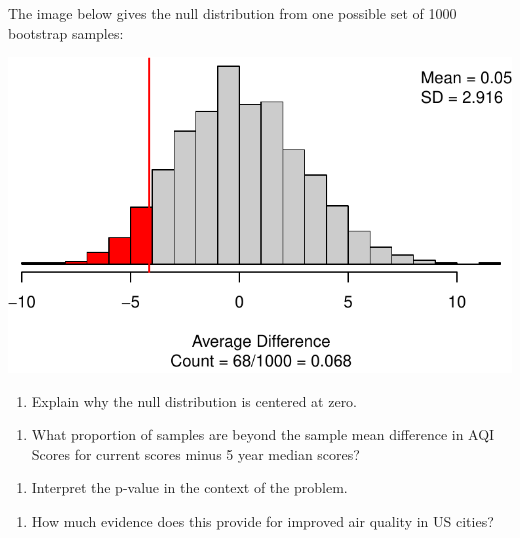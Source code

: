 \documentclass[
]{report}
\providecommand{\tightlist}{%
  \setlength{\itemsep}{0pt}\setlength{\parskip}{0pt}}
\begin{document}
\vspace{1in}

The image below gives the null distribution from one possible set of 1000 bootstrap samples:

\begin{center}\includegraphics[width=0.7\linewidth]{08-paired_files/figure-latex/unnamed-chunk-4-1} \end{center}

\begin{enumerate}
\def\labelenumi{\arabic{enumi}.}
\setcounter{enumi}{11}
\tightlist
\item
  Explain why the null distribution is centered at zero.
\end{enumerate}

\vspace{1in}

\begin{enumerate}
\def\labelenumi{\arabic{enumi}.}
\setcounter{enumi}{12}
\tightlist
\item
  What proportion of samples are beyond the sample mean difference in AQI Scores for current scores minus 5 year median scores?
\end{enumerate}

\vspace{1in}

\begin{enumerate}
\def\labelenumi{\arabic{enumi}.}
\setcounter{enumi}{13}
\tightlist
\item
  Interpret the p-value in the context of the problem.
\end{enumerate}

\vspace{1in}

\begin{enumerate}
\def\labelenumi{\arabic{enumi}.}
\setcounter{enumi}{14}
\tightlist
\item
  How much evidence does this provide for improved air quality in US cities?
\end{enumerate}
\end{document}
